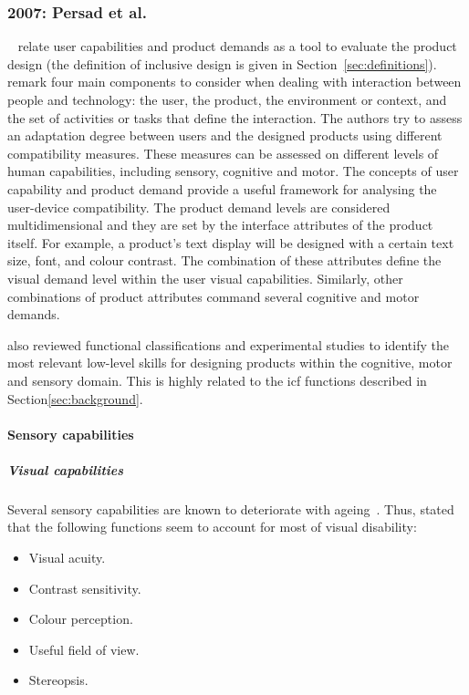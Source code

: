 
\subsubsection{2007: Persad et al.}
\label{sec:persad}

\citet{persad_characterising_2007}~\citep{persad_cognitive_2007} relate user
capabilities and product demands as a tool to evaluate the product design (the
definition of inclusive design is given in Section~\ref{sec:definitions}).
\citeauthor{persad_characterising_2007} remark four main components to consider 
when dealing with interaction between people and technology: the user, the 
product, the environment or context, and the set of activities or tasks 
that define the interaction. The authors try to assess an adaptation degree 
between users and the designed products using different compatibility measures. 
These measures can be assessed on different levels of human capabilities, 
including sensory, cognitive and motor. The concepts of user capability and 
product demand provide a useful framework for analysing the user-device 
compatibility. The product demand levels are considered multidimensional and 
they are set by the interface attributes of the product itself. For example, 
a product's text display will be designed with a certain text size, font, and 
colour contrast. The combination of these attributes define the visual demand 
level within the user visual capabilities. Similarly, other combinations of 
product attributes command several cognitive and motor demands. 

\citeauthor{persad_cognitive_2007} also reviewed functional classifications 
and experimental studies to identify the most relevant low-level skills for 
designing products within the cognitive, motor and sensory domain. This is 
highly related to the \ac{icf} functions described in Section\ref{sec:background}.

\paragraph*{Sensory capabilities}
\subparagraph*{Visual capabilities} Several sensory capabilities are known to 
deteriorate with ageing~\citep{persad_exploring_2006}. Thus, 
\citeauthor{persad_exploring_2006} stated that the following functions seem to 
account for most of visual disability:

\begin{itemize}
  \item Visual acuity.
  \item Contrast sensitivity.
  \item Colour perception.
  \item Useful field of view.
  \item Stereopsis.
\end{itemize}


